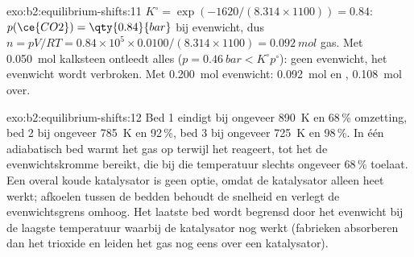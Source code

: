 \begin{solution}{exo:b2:equilibrium-shifts:11}
$K^\circ = \exp(-1620/(8.314 \times 1100)) = 0.84$: $p(\ce{CO2}) =
\qty{0.84}{bar}$ bij evenwicht, dus $n = pV/RT = 0.84 \times 10^5 \times
0.0100/(8.314 \times 1100) = \qty{0.092}{mol}$ gas. Met \qty{0.050}{mol}
kalksteen ontleedt alles ($p = \qty{0.46}{bar} < K^\circ p^\circ$):
geen evenwicht, het evenwicht wordt verbroken. Met \qty{0.200}{mol} evenwicht:
\qty{0.092}{mol}  en , \qty{0.108}{mol}  over.
\end{solution}

\begin{solution}{exo:b2:equilibrium-shifts:12}
Bed 1 eindigt bij ongeveer \qty{890}{K} en 68\,\% omzetting, bed 2 bij ongeveer
\qty{785}{K} en 92\,\%, bed 3 bij ongeveer \qty{725}{K} en 98\,\%. In één
adiabatisch bed warmt het gas op terwijl het reageert, tot het de evenwichtskromme
bereikt, die bij die temperatuur slechts ongeveer 68\,\% toelaat. Een overal koude katalysator
is geen optie, omdat de katalysator alleen heet werkt; afkoelen
tussen de bedden behoudt de snelheid en verlegt de evenwichtsgrens omhoog. Het laatste bed
wordt begrensd door het evenwicht bij de laagste temperatuur waarbij de katalysator
nog werkt (fabrieken absorberen dan het trioxide en leiden het gas nog eens over
een katalysator).
\end{solution}

